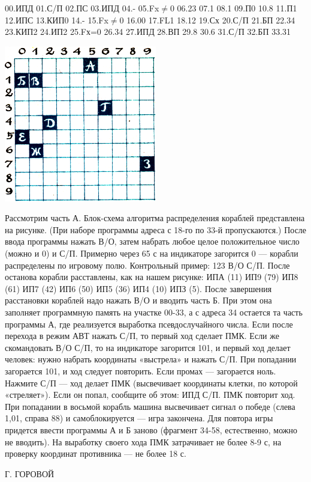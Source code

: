 \documentclass[11pt,a4paper,oneside]{article}
\begin{document}
00.ИПД 01.С/П 02.ПС 03.ИПД 04.- 05.Fx$\neq$0 06.23 07.1 08.1 09.П0 10.8 11.П1 12.ИПС 13.КИП0 14.- 15.Fx$\neq$0
16.00 17.FL1 18.12 19.Сх 20.С/П 21.БП 22.34 23.КИП2 24.ИП2 25.Fх=0
26.34 27.ИПД 28.ВП 29.8 30.6 31.С/П 32.БП 33.31

\includegraphics[width=0.5\textwidth]{sea3}

Рассмотрим часть А. Блок-схема алгоритма распределения кораблей представлена на рисунке. (При наборе программы адреса с 18-го по 33-й пропускаются.) После ввода программы нажать В/О, затем набрать любое целое положительное число (можно и 0) и С/П. Примерно через 65 с на индикаторе загорится 0 — корабли распределены по игровому полю. Контрольный пример: 123 В/О С/П. После останова корабли расставлены, как на нашем рисунке: ИПА (11) ИП9 (79) ИП8 (61) ИП7 (42) ИП6 (50) ИП5 (36) ИП4 (10) ИПЗ (5). После завершения расстановки кораблей надо нажать В/О и вводить часть Б. При этом она заполняет программную память на участке 00-33, а с адреса 34 остается та часть программы А, где реализуется выработка псевдослучайного числа. Если после перехода в режим АВТ нажать С/П, то первый ход сделает ПМК. Если же скомандовать В/О С/П, то на индикаторе загорится 101, и первый ход делает человек: нужно набрать координаты «выстрела» и нажать С/П. При попадании загорается 101, и ход следует повторить. Если промах — загорается ноль. Нажмите С/П — ход делает ПМК (высвечивает координаты клетки, по которой «стреляет»). Если он попал, сообщите об этом: ИПД С/П. ПМК повторит ход. При попадании в восьмой корабль машина высвечивает сигнал о победе (слева 1,01, справа 88) и самоблокируется — игра закончена. Для повтора игры придется ввести программы А и Б заново (фрагмент 34-58, естественно, можно не вводить). На выработку своего хода ПМК затрачивает не более 8-9 с, на проверку координат противника — не более 18 с.

Г. ГОРОВОЙ
\end{document}
